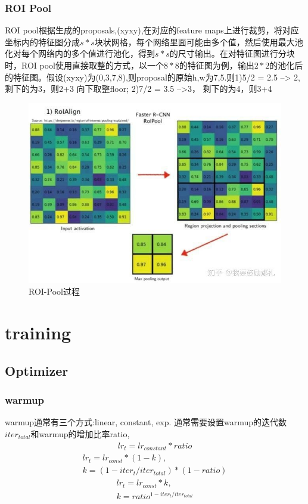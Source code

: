 \documentclass{article}
\begin{document}
\subsubsection{ROI Pool}
ROI pool根据生成的proposals,(xyxy),在对应的feature maps上进行裁剪，将对应坐标内的特征图分成$s*s$块状网格，每个网络里面可能由多个值，然后使用最大池化对每个网络内的多个值进行池化，得到$s*s$的尺寸输出。在对特征图进行分块时，ROI pool使用直接取整的方式，以一个$8*8$的特征图为例，输出$2*2$的池化后的特征图。假设(xyxy)为(0,3,7,8),则proposal的原始h,w为7,5.则1)5/2 = 2.5 --> 2, 剩下的为3，则2+3 向下取整floor; 2)7/2 = 3.5 -->3， 剩下的为4，则3+4
\begin{figure}
\centering
\includegraphics[scale=0.5]{images/roipool.jpg}
\caption{ROI-Pool过程}
\label{Fig.roi_pool}
\end{figure}

\section{training}
\subsection{Optimizer}
\subsubsection{warmup}
warmup通常有三个方式:linear, constant, exp. 通常需要设置warmup的迭代数$iter_{total}$和warmup的增加比率ratio,
\begin{align}
lr_t = lr_{constant}*ratio
\end{align}
\begin{equation}
\begin{aligned}
lr_t = lr_{const}*(1-k), \\
k= (1-iter_t /iter_{total}) * (1-ratio)
\end{aligned}
\end{equation}
\begin{align}
lr_t = lr_{const}*k, \\
k=ratio^{1-iter_t/iter_{total}}
\end{align}
\end{document}
